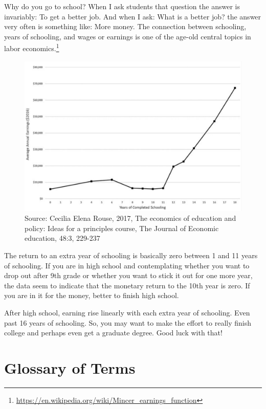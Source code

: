 \documentclass[
]{book}
\begin{document}
Why do you go to school? When I ask students that question the answer is invariably: To get a better job. And when I ask: What is a better job? the answer very often is something like: More money. The connection between schooling, years of schooling, and wages or earnings is one of the age-old central topics in labor economics.\footnote{\url{https://en.wikipedia.org/wiki/Mincer_earnings_function}}

\begin{figure}

{\centering \includegraphics[width=1\linewidth]{img/rationalchoice/fig11} 

}

\caption{Source: Cecilia Elena Rouse, 2017, The economics of education and policy: Ideas for a principles course, The Journal of Economic education, 48:3, 229-237}\label{fig:rationalchoice11}
\end{figure}

The return to an extra year of schooling is basically zero between 1 and 11 years of schooling. If you are in high school and contemplating whether you want to drop out after 9th grade or whether you want to stick it out for one more year, the data seem to indicate that the monetary return to the 10th year is zero. If you are in it for the money, better to finish high school.

After high school, earning rise linearly with each extra year of schooling. Even past 16 years of schooling. So, you may want to make the effort to really finish college and perhaps even get a graduate degree. Good luck with that!

\hypertarget{glossary-of-terms-2}{%
\section{Glossary of Terms}\label{glossary-of-terms-2}}
\end{document}
